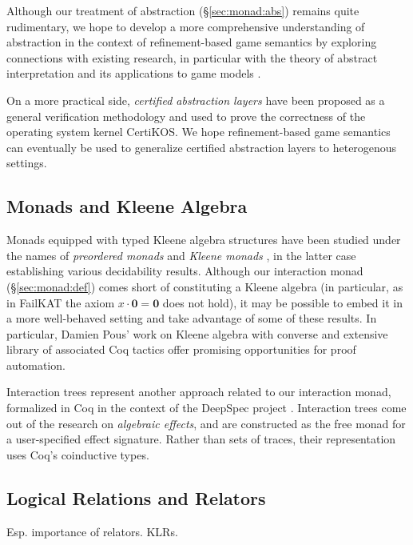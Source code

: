 \documentclass[acmsmall,timestamp,review,anonymous]{acmart}
\begin{document}
Although our treatment of abstraction (\S\ref{sec:monad:abs})
remains quite rudimentary,
we hope to develop a more comprehensive understanding
of abstraction in the context of refinement-based game semantics
by exploring connections with existing research,
in particular with
the theory of abstract interpretation \cite{absint,aif}
and its applications to game models \cite{aigp}.

On a more practical side,
\emph{certified abstraction layers} \cite{popl15,osdi16,ccal}
have been proposed as a general verification methodology
and used to prove the correctness of the operating system kernel CertiKOS.
We hope refinement-based game semantics
can eventually be used to generalize
certified abstraction layers to heterogenous settings.


\subsection{Monads and Kleene Algebra} %

Monads equipped with
typed Kleene algebra structures
have been studied under the names of
\emph{preordered monads} \cite{pom} and
\emph{Kleene monads} \cite{kleenem},
in the latter case establishing various decidability results.
Although our interaction monad (\S\ref{sec:monad:def})
comes short of constituting a Kleene algebra
(in particular, as in FailKAT \cite{failkat}
the axiom $x \cdot \mathbf{0} = \mathbf{0}$ does not hold),
it may be possible to embed it in a more well-behaved setting
and take advantage of some of these results.
In particular,
Damien Pous' work on Kleene algebra with converse
and extensive library of associated Coq tactics
offer promising opportunities for proof automation.

Interaction trees \cite{itrees}
represent another approach
related to our interaction monad,
formalized in Coq in the context of the DeepSpec project \cite{deepspec}.
Interaction trees
come out of the research on \emph{algebraic effects},
and are constructed as the free monad
for a user-specified effect signature.
Rather than sets of traces,
their representation uses Coq's coinductive types.


\subsection{Logical Relations and Relators} %

Esp. importance of relators.
KLRs.
\end{document}
